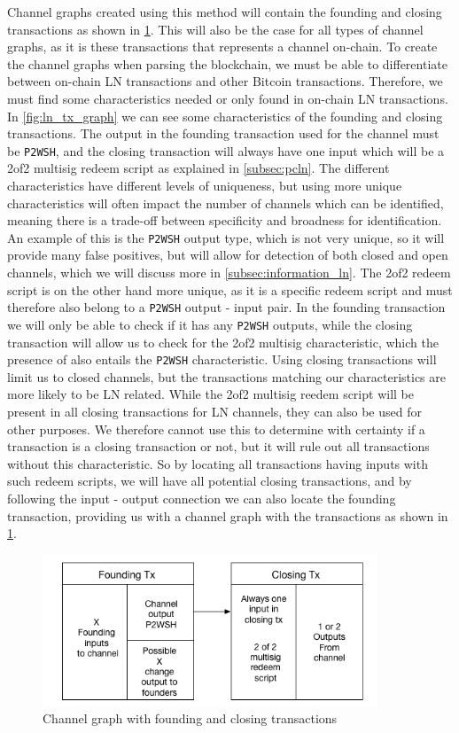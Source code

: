 Channel graphs created using this method will contain the founding and closing transactions as shown in \cref{fig:ln_tx_graph_small}.
This will also be the case for all types of channel graphs, as it is these transactions that represents a channel on-chain.
To create the channel graphs when parsing the blockchain, we must be able to differentiate between on-chain LN transactions and other Bitcoin transactions. Therefore, we must find some characteristics needed or only found in on-chain LN transactions. 
In \cref{fig:ln_tx_graph} we can see some characteristics of the founding and closing transactions.
The output in the founding transaction used for the channel must be {\tt P2WSH}, and the closing transaction will always have one input which will be a 2of2 multisig redeem script as explained in \cref{subsec:pcln}. The different characteristics have different levels of uniqueness, but using more unique characteristics will often impact the number of channels which can be identified, meaning there is a trade-off between specificity and broadness for identification. An example of this is the {\tt P2WSH} output type, which is not very unique, so it will provide many false positives, but will allow for detection of both closed and open channels, which we will discuss more in \cref{subsec:information_ln}. 
The 2of2 redeem script is on the other hand more unique, as it is a specific redeem script and must therefore also belong to a {\tt P2WSH} output - input pair. In the founding transaction we will only be able to check if it has any {\tt P2WSH} outputs, while the closing transaction will allow us to check for the 2of2 multisig characteristic, which the presence of also entails the {\tt P2WSH} characteristic.
Using closing transactions will limit us to closed channels, but the transactions matching our characteristics are more likely to be LN related. While the 2of2 multisig reedem script will be present in all closing transactions for LN channels, they can also be used for other purposes. We therefore cannot use this to determine with certainty if a transaction is a closing transaction or not, but it will rule out all transactions without this characteristic. So by locating all transactions having inputs with such redeem scripts, we will have all potential closing transactions, and by following the input - output connection we can also locate the founding transaction, providing us with a channel graph with the transactions as shown in \cref{fig:ln_tx_graph_small}.

\begin{figure}[h]
    \centering
    \includegraphics[width=10cm]{figures/ln_tx_graph_small.png}
    \caption{Channel graph with founding and closing transactions}
    \label{fig:ln_tx_graph_small}
\end{figure}

